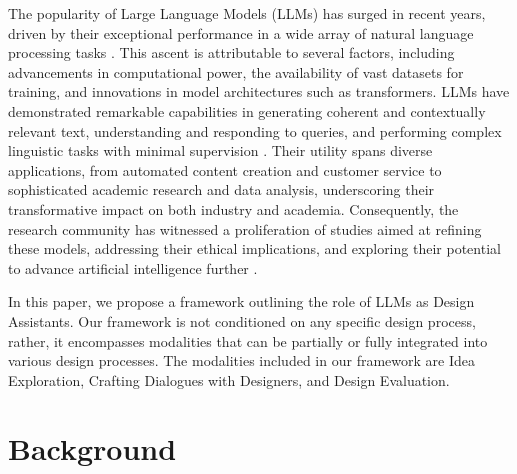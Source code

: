 \documentclass{article}
\begin{document}
The popularity of Large Language Models (LLMs) has surged in recent years, driven by their exceptional performance in a wide array of natural language processing tasks \cite{zhao2023survey}. This ascent is attributable to several factors, including advancements in computational power, the availability of vast datasets for training, and innovations in model architectures such as transformers. LLMs have demonstrated remarkable capabilities in generating coherent and contextually relevant text, understanding and responding to queries, and performing complex linguistic tasks with minimal supervision \cite{li2024pre}. Their utility spans diverse applications, from automated content creation and customer service to sophisticated academic research and data analysis, underscoring their transformative impact on both industry and academia. Consequently, the research community has witnessed a proliferation of studies aimed at refining these models, addressing their ethical implications, and exploring their potential to advance artificial intelligence further \cite{stella2023can,duan2023towards}.

In this paper, we propose a framework outlining the role of LLMs as Design Assistants. Our framework is not conditioned on any specific design process, rather, it encompasses modalities that can be partially or fully integrated into various design processes.  The modalities included in our framework are Idea Exploration, Crafting Dialogues with Designers, and Design Evaluation.



\section{Background}
\end{document}
